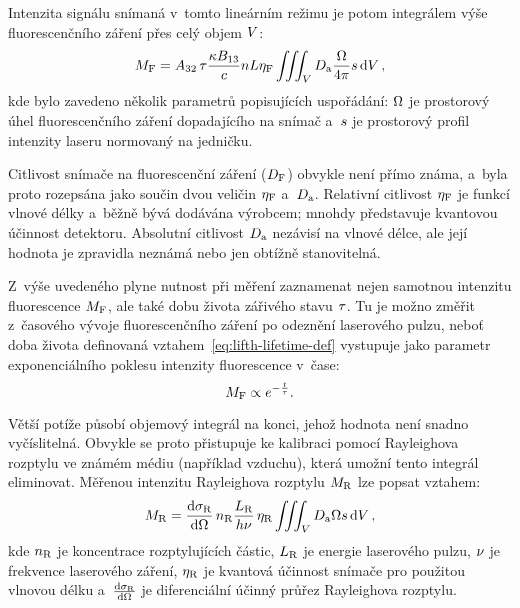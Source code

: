 Intenzita signálu snímaná v~tomto lineárním režimu je potom
integrálem výše fluorescenčního záření přes celý objem $V$:
\begin{equation}
	\label{eq:lifth-lifsignal}
	M_\text{F} = A_{32}\,\tau
	\frac{\kappa B_{13}}{c}
	n L \eta_\text{F}
	\iiint_V D_\text{a} \frac{\Omega}{4\pi} s \dd{V},
\end{equation}
kde bylo zavedeno několik parametrů popisujících uspořádání:
$\Omega$ je prostorový úhel fluorescenčního záření dopadajícího
na snímač
a~$s$ je prostorový profil intenzity laseru normovaný na jedničku.

Citlivost snímače na fluorescenční záření ($D_\text{F}$) obvykle není přímo
známa,
a~byla proto rozepsána jako součin dvou veličin $\eta_\text{F}$ a~$D_\text{a}$.
Relativní citlivost $\eta_\text{F}$ je funkcí vlnové délky a~běžně bývá dodávána
výrobcem; mnohdy představuje kvantovou účinnost detektoru.
Absolutní citlivost $D_\text{a}$ nezávisí na vlnové délce,
ale její hodnota je zpravidla neznámá nebo jen obtížně stanovitelná.

Z~výše uvedeného plyne nutnost při měření zaznamenat nejen samotnou
intenzitu fluorescence $M_\text{F}$,
ale také dobu života zářivého stavu $\tau$.
Tu je možno změřit z~časového vývoje fluorescenčního záření po odeznění
laserového pulzu,
neboť doba života definovaná vztahem~\eqref{eq:lifth-lifetime-def} vystupuje
jako parametr exponenciálního poklesu intenzity fluorescence v~čase:
\begin{equation}
	M_\text{F} \propto e^{-\frac{t}{\tau}}.
\end{equation}

Větší potíže působí objemový integrál na konci, jehož hodnota není snadno
vyčíslitelná.
Obvykle se proto přistupuje ke kalibraci pomocí Ray\-leigh\-ova rozptylu
ve známém médiu (například vzduchu),
která umožní tento integrál eliminovat.
Měřenou intenzitu Rayleighova rozptylu $M_\text{R}$ lze popsat vztahem:
\begin{equation}
	\label{eq:lifth-rayleighsignal}
	M_\text{R} = \dv{\sigma_\text{R}}{\Omega} \, n_\text{R}
	\frac{L_\text{R}}{h\nu} \, \eta_\text{R}
	\iiint_V D_\text{a} \Omega s \dd{V},
\end{equation}
kde $n_\text{R}$ je koncentrace rozptylujících částic,
$L_\text{R}$ je energie laserového pulzu,
$\nu$ je frekvence laserového záření,
$\eta_\text{R}$ je kvantová účinnost snímače pro použitou vlnovou délku
a~$\dv{\sigma_\text{R}}{\Omega}$ je diferenciální účinný průřez Rayleighova rozptylu.

